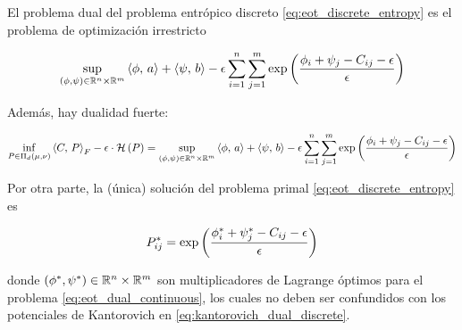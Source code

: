\begin{prop}
	\label{prop:eot_dual_discrete}
	El problema dual del problema entrópico discreto \eqref{eq:eot_discrete_entropy} es el problema de optimización irrestricto

	\begin{equation}
		\label{eq:eot_dual_discrete}
		\sup_{(\phi,\psi)\in\mathbb{R}^n\times\mathbb{R}^m}
		\left\langle \phi,\,a\right\rangle + \left\langle \psi,\,b\right\rangle
		-\epsilon \sum_{i=1}^n\sum_{j=1}^m \exp\left(\frac{\phi_i + \psi_j-C_{ij} - \epsilon}{\epsilon}\right)
	\end{equation}

	Además, hay dualidad fuerte:

	\begin{equation*}
		\inf_{P\in\Pi_d(\mu,\nu)} \left\langle C,\,P\right\rangle_F - \epsilon\cdot\mathcal{H}\left(P\right)
		= \sup_{(\phi,\psi)\in\mathbb{R}^n\times\mathbb{R}^m}
		\left\langle \phi,\,a\right\rangle + \left\langle \psi,\,b\right\rangle
		-\epsilon \sum_{i=1}^n\sum_{j=1}^m \exp\left(\frac{\phi_i + \psi_j-C_{ij} - \epsilon}{\epsilon}\right)
	\end{equation*}

	Por otra parte, la (única) solución del problema primal \eqref{eq:eot_discrete_entropy} es

	\begin{equation*}
		P_{ij}^* = \exp\left(\frac{\phi_i^* + \psi_j^* - C_{ij} - \epsilon}{\epsilon}\right)
	\end{equation*}

	donde $(\phi^*,\psi^*)\in\mathbb{R}^n\times\mathbb{R}^m$ son multiplicadores de Lagrange óptimos para el problema \eqref{eq:eot_dual_continuous}, los cuales no deben ser confundidos con los potenciales de Kantorovich en \eqref{eq:kantorovich_dual_discrete}.
\end{prop}


